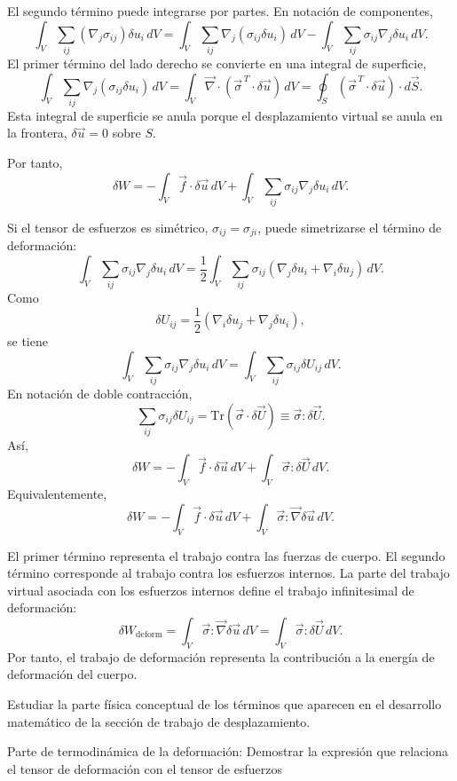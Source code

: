 El segundo término puede integrarse por partes. En notación de componentes,
$$ \int_V \sum_{ij}(\nabla_j \sigma_{ij})\delta u_i\,dV = \int_V \sum_{ij}\nabla_j(\sigma_{ij}\delta u_i)\,dV - \int_V \sum_{ij}\sigma_{ij}\nabla_j\delta u_i\,dV. $$
El primer término del lado derecho se convierte en una integral de superficie,
$$ \int_V \sum_{ij}\nabla_j(\sigma_{ij}\delta u_i)\,dV = \int_V \vec{\nabla}\cdot(\vec{\sigma}^{\,T}\cdot\delta\vec{u})\,dV = \oint_S (\vec{\sigma}^{\,T}\cdot\delta\vec{u})\cdot d\vec{S}. $$
Esta integral de superficie se anula porque el desplazamiento virtual se anula en la frontera, $\delta\vec{u}=0$ sobre $S$.

Por tanto,
$$ \delta W = -\int_V \vec{f}\cdot\delta\vec{u}\,dV + \int_V \sum_{ij}\sigma_{ij}\nabla_j\delta u_i\,dV. $$

Si el tensor de esfuerzos es simétrico, $\sigma_{ij}=\sigma_{ji}$, puede simetrizarse el término de deformación:
$$ \int_V \sum_{ij}\sigma_{ij}\nabla_j\delta u_i\,dV = \frac{1}{2}\int_V \sum_{ij}\sigma_{ij}(\nabla_j\delta u_i + \nabla_i\delta u_j)\,dV. $$
Como
$$ \delta U_{ij} = \frac{1}{2}(\nabla_i\delta u_j + \nabla_j\delta u_i), $$
se tiene
$$ \int_V \sum_{ij}\sigma_{ij}\nabla_j\delta u_i\,dV = \int_V \sum_{ij}\sigma_{ij}\delta U_{ij}\,dV. $$
En notación de doble contracción,
$$ \sum_{ij}\sigma_{ij}\delta U_{ij} = \mathrm{Tr}(\vec{\sigma}\cdot\delta\vec{U}) \equiv \vec{\sigma}:\delta\vec{U}. $$
Así,
$$ \delta W = -\int_V \vec{f}\cdot\delta\vec{u}\,dV + \int_V \vec{\sigma}:\delta\vec{U}\,dV. $$
Equivalentemente,
$$ \delta W = -\int_V \vec{f}\cdot\delta\vec{u}\,dV + \int_V \vec{\sigma}:\vec{\nabla}\delta\vec{u}\,dV. $$

El primer término representa el trabajo contra las fuerzas de cuerpo. El segundo término corresponde al trabajo contra los esfuerzos internos. La parte del trabajo virtual asociada con los esfuerzos internos define el trabajo infinitesimal de deformación:
$$ \delta W_{\mathrm{deform}} = \int_V \vec{\sigma}:\vec{\nabla}\delta\vec{u}\,dV = \int_V \vec{\sigma}:\delta\vec{U}\,dV. $$
Por tanto, el trabajo de deformación representa la contribución a la energía de deformación del cuerpo.
\fi


Estudiar la parte física conceptual de los términos que aparecen en el desarrollo matemático de la sección de trabajo de desplazamiento.

Parte de termodinámica de la deformación: Demostrar la expresión que relaciona el tensor de deformación con el tensor de esfuerzos

